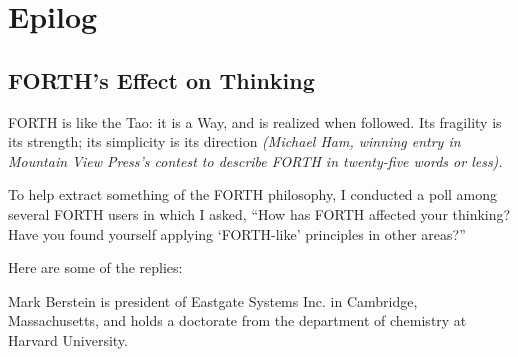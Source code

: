 \part{Epilog}
\chapter{
FORTH's Effect
on Thinking}
\begin{tfquot}
FORTH is like the Tao: it is a Way, and is realized when followed.  Its
fragility is its strength; its simplicity is its direction {\em (Michael Ham,
winning entry in Mountain View Press's contest to describe FORTH in twenty-five 
words or less).}
\end{tfquot}

To help extract something of the FORTH philosophy, I conducted a poll
among several FORTH users in which I asked, ``How has FORTH affected
your thinking?  Have you found yourself applying `FORTH-like' 
principles in other areas?''

Here are some of the replies:

Mark Berstein is president of Eastgate Systems Inc. in Cambridge, 
Massachusetts, and holds a doctorate from the department of 
chemistry at Harvard University.

